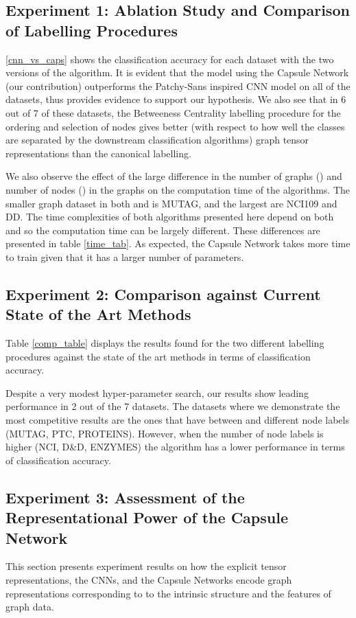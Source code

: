 \documentclass[conference]{IEEEtran}
\begin{document}
\subsection{Experiment 1: Ablation Study and Comparison of Labelling Procedures}

\autoref{cnn_vs_caps} shows the classification accuracy for each dataset with the two versions of the algorithm.
It is evident that the model using the Capsule Network (our contribution) outperforms the Patchy-Sans inspired CNN model \cite{niepert2016learning} on all of the datasets, thus provides evidence to support our hypothesis. We also see that in 6 out of 7 of these datasets, the Betweeness Centrality labelling procedure for the ordering and selection of nodes gives better (with respect to how well the classes are separated by the downstream classification algorithms) graph tensor representations than the canonical labelling.


We also observe the effect of the large difference in the number of graphs () and number of nodes () in the graphs on the computation time of the algorithms. The smaller graph dataset in both  and  is MUTAG, and the largest are NCI109 and DD. The time complexities of both algorithms presented here depend on both  and  so the computation time can be largely different. These differences are presented in table \ref{time_tab}. 
As expected, the Capsule Network takes more time to train given that it has a larger number of parameters.



\subsection{Experiment 2: Comparison against Current State of the Art Methods}

Table \ref{comp_table} displays the results found for the two different labelling procedures against the state of the art methods in terms of classification accuracy.

Despite a very modest hyper-parameter search, our results show leading performance in 2 out of the 7 datasets. The datasets where we demonstrate the most competitive results are the ones that have between  and  different node labels (MUTAG, PTC, PROTEINS). However, when the number of node labels is higher (NCI, D\&D, ENZYMES) the algorithm has a lower performance in terms of classification accuracy.



\subsection{Experiment 3: Assessment of the Representational Power of the Capsule Network}
This section presents experiment results on how the explicit tensor representations, the CNNs, and the Capsule Networks encode graph representations corresponding to to the intrinsic structure and the features of graph data.
\end{document}
